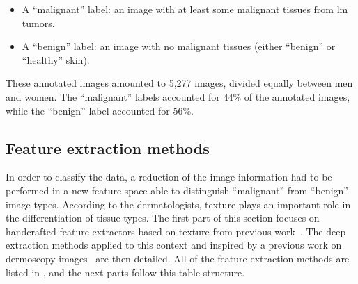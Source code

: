 \documentclass[journal,article,accept,moreauthors,pdftex, applsci]{Definitions/mdpi}
\begin{document}
\begin{itemize}
\item A “malignant” label: an image with at least some malignant tissues from \ac{lm} tumors.
\item A “benign” label: an image with no malignant tissues (either “benign” or “healthy” skin).
\end{itemize}
These annotated images amounted to 5,277 images, divided equally between men and women. The “malignant” labels accounted for 44\% of the annotated images, while the “benign” label accounted for 56\%.\par

\subsection{Feature extraction methods}
\label{sec:features}
In order to classify the data, a reduction of the image information had to be performed in a new feature space able to distinguish “malignant” from “benign” image types. According to the dermatologists, texture plays an important role in the differentiation of tissue types. The first part of this section focuses on handcrafted feature extractors based on texture from previous work~\cite{Wiltgen2008}. The deep extraction methods applied to this context and inspired by a previous work on dermoscopy images~\cite{Esteva2017} are then detailed. All of the feature extraction methods are listed in , and the next parts follow this table structure.\par
\end{document}
